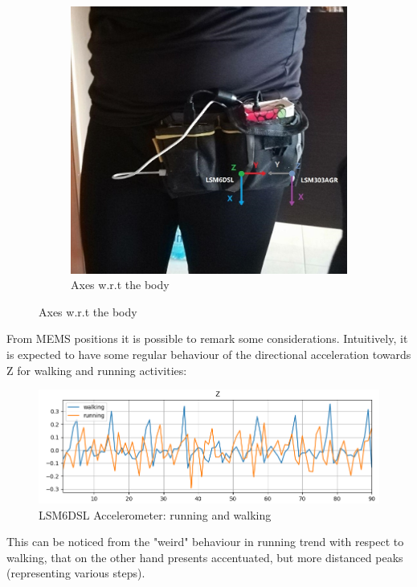 \begin{center}
\begin{figure}[H]
\begin{subfigure}[H]{0.45\textwidth}
			\includegraphics[scale=0.45]{figures/sensor_orientation.jpg}
			\caption{Axes w.r.t the body}\label{fig:4b}
		\end{subfigure}
	\end{figure} 
\end{center}
From MEMS positions it is possible to remark some considerations. Intuitively, it is expected to have some regular behaviour of the directional acceleration towards Z for walking and running activities:
\begin{figure}[H]
		\hfill\includegraphics[scale=0.8]{figures/plot_ACC_LSM6DSL_DS_walking_running_Z.png}\hspace*{\fill}
		\caption{LSM6DSL Accelerometer: running and walking}\label{fig:5}
		\centering
\end{figure}
This can be noticed from the "weird" behaviour in running trend with respect to walking, that on the other hand presents accentuated, but more distanced peaks (representing various steps).\newline
